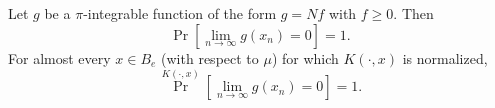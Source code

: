 Let $g$ be a $\pi$-integrable function of the form $g = Nf$ with $f \geq 0$. Then
\[
\Pr\left[\lim_{n \to \infty} g(x_n) = 0\right] = 1.
\]
For almost every $x \in B_e$ (with respect to $\mu$) for which $K(\cdot, x)$ is normalized,
\[
\Pr^{K(\cdot, x)}\left[\lim_{n \to \infty} g(x_n) = 0\right] = 1.
\]
